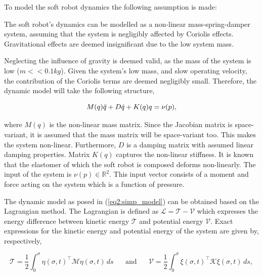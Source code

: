 To model the soft robot dynamics the following assumption is made:

\begin{theorem}
The soft robot's dynamics can be modelled as a non-linear mass-spring-damper system, assuming that the system is negligibly affected by Coriolis effects. Gravitational effects are deemed insignificant due to the low system mass.
\end{theorem}

Neglecting the influence of gravity is deemed valid, as the mass of the system is low ($m << 0.1 kg$). Given the system's low mass, and slow operating velocity, the contribution of the Coriolis terms are deemed negligibly small. Therefore, the dynamic model will take the following structure,


\begin{equation}
    M(q)\Ddot{q} + D\dot{q} + K(q)q = \nu(p),
    \label{eq2:simp_model}
\end{equation}


where $M(q)$ is the non-linear mass matrix. Since the Jacobian matrix is space-variant, it is assumed that the mass matrix will be space-variant too. This makes the system non-linear. Furthermore, $D$ is a damping matrix with assumed linear damping properties. Matrix $K(q)$ captures the non-linear stiffness. It is known that the elastomer of which the soft robot is composed deforms non-linearly. The input of the system is $\nu(p) \in \mathbb{R}^2$. This input vector consists of a moment and force acting on the system which is a function of pressure. 

The dynamic model as posed in (\ref{eq2:simp_model}) can be obtained based on the Lagrangian method. The Lagrangian is defined as $\mathcal{L} = \mathcal{T} -\mathcal{V}$ which expresses the energy difference between kinetic energy $\mathcal{T}$ and potential energy $\mathcal{V}$. Exact expressions for the kinetic energy and potential energy of the system are given by, respectively,

\begin{equation}
    \mathcal{T} = \frac{1}{2}\int_0^{\sigma} \eta(\sigma,t)^\top \mathcal{M} \eta(\sigma,t) \hspace{2pt} ds \hspace{20pt} \text{and} \hspace{20pt}  \mathcal{V} = \frac{1}{2}\int_0^{\sigma} \xi(\sigma,t)^\top \mathcal{K} \xi(\sigma,t)  \hspace{2pt} ds,
    \label{eq2:T}
\end{equation}


